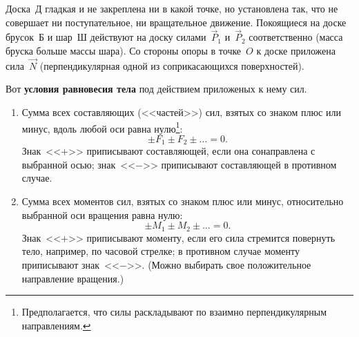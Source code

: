 \documentclass[main.tex]{subfiles}
\begin{document}











Доска~Д гладкая и не закреплена ни в какой точке, но установлена так, что не совершает ни поступательное, ни вращательное движение. Покоящиеся на доске брусок~Б и шар~Ш действуют на доску силами~$\vec P_1$ и~$\vec P_2$ соответственно (масса бруска больше массы шара). Со стороны опоры в точке~$O$ к доске приложена сила~$\vec N$ (перпендикулярная одной из соприкасающихся поверхностей).

Вот \textbf{условия равновесия тела} под действием приложеных к нему сил.
\begin{enumerate}
    \item Сумма всех составляющих (<<частей>>) сил, взятых со знаком плюс или минус, вдоль любой оси равна нулю\footnote{Предполагается, что силы раскладывают по взаимно перпендикулярным направлениям.}:
    \begin{equation}\label{32equil_e1}
        \pm F_1\pm F_2\pm\ldots =0.
    \end{equation}
    Знак~<<$+$>> приписывают составляющей, если она сонаправлена с выбранной осью; знак~<<$-$>> приписывают составляющей в противном случае.
    
    \item Сумма всех моментов сил, взятых со знаком плюс или минус, относительно выбранной оси вращения равна нулю:
    \begin{equation}\label{32equil_e2}
        \pm M_1\pm M_2\pm\ldots =0.
    \end{equation}
    Знак~<<$+$>> приписывают моменту, если его сила стремится повернуть тело, например, по часовой стрелке; в противном случае моменту приписывают знак~<<$-$>>. (Можно выбирать свое положительное направление вращения.)
\end{enumerate}
\end{document}
